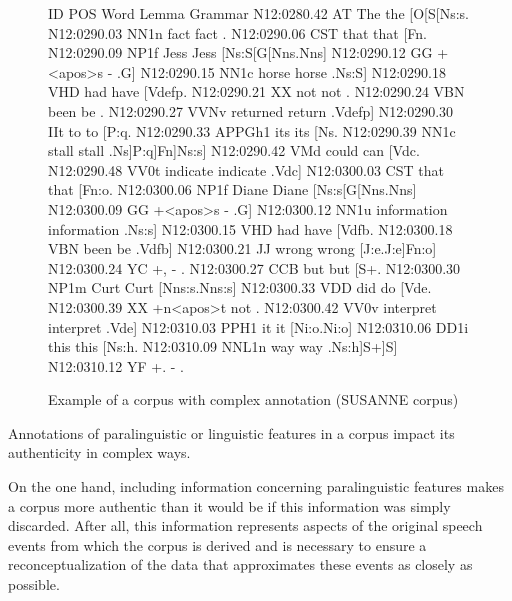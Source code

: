 \begin{figure}[!htbp]
\caption{Example of a corpus with complex annotation (SUSANNE corpus)}
\label{fig:susanneannotation}
\hrulefill
\begin{fitverb}
ID            POS      Word          Lemma         Grammar
N12:0280.42   AT       The           the           [O[S[Ns:s.
N12:0290.03   NN1n     fact          fact          .
N12:0290.06   CST      that          that          [Fn.
N12:0290.09   NP1f     Jess          Jess          [Ns:S[G[Nns.Nns]
N12:0290.12   GG       +<apos>s      -             .G]
N12:0290.15   NN1c     horse         horse         .Ns:S]
N12:0290.18   VHD      had           have          [Vdefp.
N12:0290.21   XX       not           not           .
N12:0290.24   VBN      been          be            .
N12:0290.27   VVNv     returned      return        .Vdefp]
N12:0290.30   IIt      to            to            [P:q.
N12:0290.33   APPGh1   its           its           [Ns.
N12:0290.39   NN1c     stall         stall         .Ns]P:q]Fn]Ns:s]
N12:0290.42   VMd      could         can           [Vdc.
N12:0290.48   VV0t     indicate      indicate      .Vdc]
N12:0300.03   CST      that          that          [Fn:o.
N12:0300.06   NP1f     Diane         Diane         [Ns:s[G[Nns.Nns]
N12:0300.09   GG       +<apos>s       -            .G]
N12:0300.12   NN1u     information   information   .Ns:s]
N12:0300.15   VHD      had           have          [Vdfb.
N12:0300.18   VBN      been          be            .Vdfb]
N12:0300.21   JJ       wrong         wrong         [J:e.J:e]Fn:o]
N12:0300.24   YC       +,            -             .
N12:0300.27   CCB      but           but           [S+.
N12:0300.30   NP1m     Curt          Curt          [Nns:s.Nns:s]
N12:0300.33   VDD      did           do            [Vde.
N12:0300.39   XX       +n<apos>t     not           .
N12:0300.42   VV0v     interpret     interpret     .Vde]
N12:0310.03   PPH1     it            it            [Ni:o.Ni:o]
N12:0310.06   DD1i     this          this          [Ns:h.
N12:0310.09   NNL1n    way           way           .Ns:h]S+]S]
N12:0310.12   YF       +.            -             .
\end{fitverb}
\hrulefill
\end{figure}

Annotations of paralinguistic or linguistic features in a corpus impact its authenticity in complex ways.

On the one hand, including information concerning paralinguistic features makes a corpus more authentic than it would be if this information was simply discarded. After all, this information represents aspects of the original speech events from which the corpus is derived and is necessary to ensure a reconceptualization of the data that approximates these events as closely as possible. 

